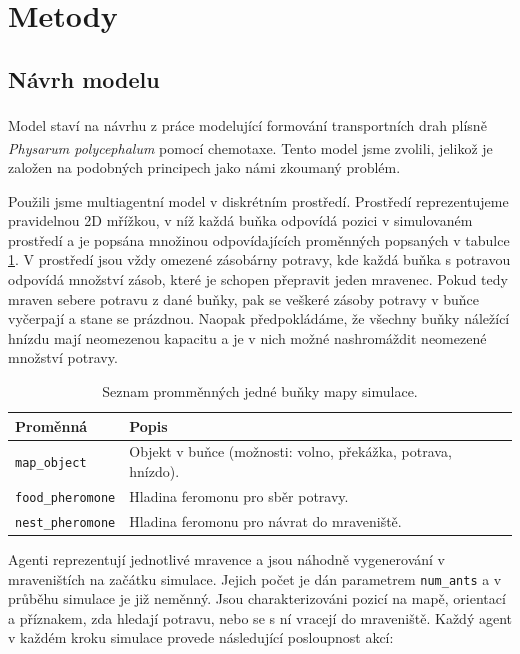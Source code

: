 \documentclass[10pt,a4paper,twocolumn]{article}
\begin{document}
\section{Metody}

\subsection{Návrh modelu}
\label{subsec:model_setup}
Model staví na návrhu z 
práce\textsuperscript{\cite{jones2010characteristics}}
modelující formování transportních drah plísně 
\emph{Physarum polycephalum}\textsuperscript{\cite{durham1976control}}
pomocí chemotaxe. Tento model jsme zvolili, jelikož je založen na podobných 
principech jako námi zkoumaný problém.

Použili jsme multiagentní model v diskrétním prostředí. Prostředí reprezentujeme 
pravidelnou 2D mřížkou, v níž každá buňka odpovídá pozici v simulovaném prostředí a je 
popsána množinou odpovídajících proměnných popsaných v tabulce \ref{table:mapa}.
V prostředí jsou vždy omezené zásobárny potravy, kde každá buňka s potravou
odpovídá množství zásob, které je schopen přepravit jeden mravenec. Pokud
tedy mraven sebere potravu z dané buňky, pak se veškeré zásoby potravy v 
buňce vyčerpají a stane se prázdnou. Naopak předpokládáme, že všechny
buňky náležící hnízdu mají neomezenou kapacitu a je v nich možné 
nashromáždit neomezené množství potravy.


\begin{table}[t]
  \centering %
  \begin{tabular}{l p{5cm}}
  \toprule
  Proměnná & Popis \\
  \midrule
    \texttt{map\_object} & Objekt v buňce (možnosti:
    volno, překážka, potrava, hnízdo). \\
    \texttt{food\_pheromone} & Hladina feromonu pro sběr potravy.\\
    \texttt{nest\_pheromone} & Hladina feromonu pro návrat do mraveniště.\\	
  \bottomrule
  \end{tabular}
  \caption{Seznam promměnných jedné buňky mapy simulace.} \label{table:mapa} 
\end{table}


Agenti reprezentují jednotlivé mravence a jsou náhodně 
vygenerování v mraveništích na začátku simulace. Jejich počet je dán 
parametrem \texttt{num\_ants} a 
v průběhu simulace je již neměnný. Jsou charakterizováni pozicí na mapě,
orientací a příznakem, zda hledají potravu, nebo se s ní vracejí do mraveniště.
Každý agent v každém kroku simulace provede následující posloupnost akcí:
\end{document}

